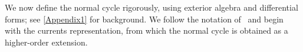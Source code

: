 \documentclass[sn-mathphys-num]{sn-jnl}%
\theoremstyle{thmstyleone}%
\theoremstyle{thmstyletwo}%
\theoremstyle{thmstylethree}%
\numberwithin{remark}{section}
\numberwithin{definition}{section}
\numberwithin{equation}{section}
\numberwithin{theorem}{section}
\newcommand{\norm}[1]{\left\lVert#1\right\rVert}
\newcommand{\R}{\ensuremath{\mathbb{R}}}%
\begin{document}
We now define the normal cycle rigorously, using exterior algebra
and differential forms; see \cref{Appendix1} for background. We
follow the notation of~\cite{NCThesis} and begin with the currents
representation, from which the normal cycle is obtained as a
higher-order extension.
\end{document}
